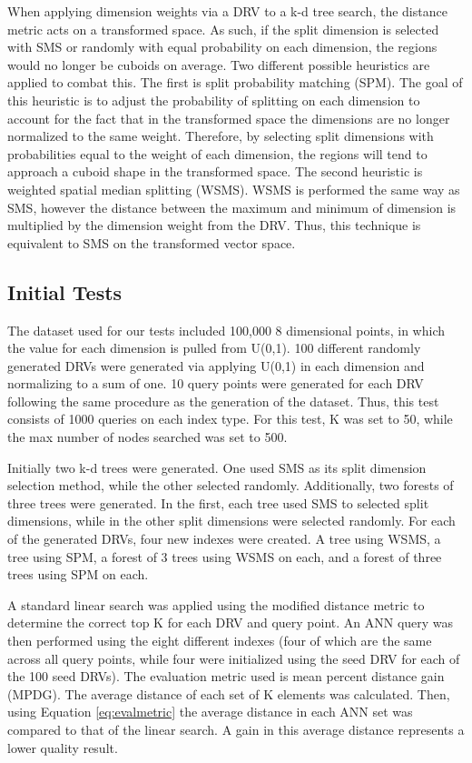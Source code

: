 When applying dimension weights via a DRV to a k-d tree search, the distance metric acts on a transformed space.  As such, if the split dimension is selected with SMS or randomly with equal probability on each dimension, the regions would no longer be cuboids on average.  Two different possible heuristics are applied to combat this.  The first is split probability matching (SPM).  The goal of this heuristic is to adjust the probability of splitting on each dimension to account for the fact that in the transformed space the dimensions are no longer normalized to the same weight.  Therefore, by selecting split dimensions with probabilities equal to the weight of each dimension, the regions will tend to approach a cuboid shape in the transformed space.  The second heuristic is weighted spatial median splitting (WSMS).  WSMS is performed the same way as SMS, however the distance between the maximum and minimum of dimension is multiplied by the dimension weight from the DRV.  Thus, this technique is equivalent to SMS on the transformed vector space.

\subsection{Initial Tests}
\label{sec:inittest}

The dataset used for our tests included 100,000 8 dimensional points, in which the value for each dimension is pulled from U(0,1).  100 different randomly generated DRVs were generated via applying U(0,1) in each dimension and normalizing to a sum of one.  10 query points were generated for each DRV following the same procedure as the generation of the dataset.  Thus, this test consists of 1000 queries on each index type.  For this test, K was set to 50, while the max number of nodes searched was set to 500.

Initially two k-d trees were generated.  One used SMS as its split dimension selection method, while the other selected randomly.  Additionally, two forests of three trees were generated. In the first, each tree used SMS to selected split dimensions, while in the other split dimensions were selected randomly.  For each of the generated DRVs, four new indexes were created.  A tree using WSMS, a tree using SPM, a forest of 3 trees using WSMS on each, and a forest of three trees using SPM on each.

A standard linear search was applied using the modified distance metric to determine the correct top K for each DRV and query point.  An ANN query was then performed using the eight different indexes (four of which are the same across all query points, while four were initialized using the seed DRV for each of the 100 seed DRVs).  The evaluation metric used is mean percent distance gain (MPDG).  The average distance of each set of K elements was calculated.  Then, using Equation \ref{eq:evalmetric} the average distance in each ANN set was compared to that of the linear search.  A gain in this average distance represents a lower quality result.


